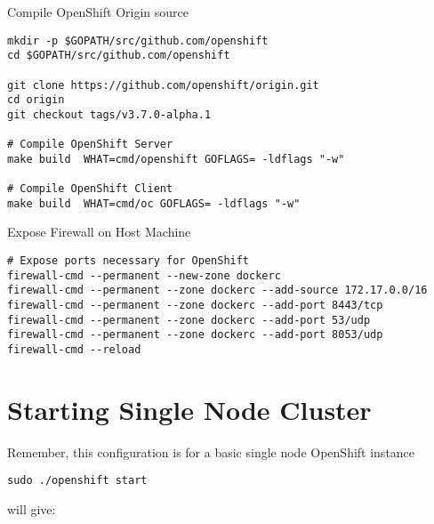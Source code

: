 \documentclass{article}
\begin{document}
Compile OpenShift Origin source
\begin{lstlisting}[style=shell]
mkdir -p $GOPATH/src/github.com/openshift
cd $GOPATH/src/github.com/openshift

git clone https://github.com/openshift/origin.git
cd origin
git checkout tags/v3.7.0-alpha.1

# Compile OpenShift Server
make build  WHAT=cmd/openshift GOFLAGS= -ldflags "-w"

# Compile OpenShift Client
make build  WHAT=cmd/oc GOFLAGS= -ldflags "-w"
\end{lstlisting}

Expose Firewall on Host Machine

\begin{lstlisting}[style=shell]
# Expose ports necessary for OpenShift
firewall-cmd --permanent --new-zone dockerc
firewall-cmd --permanent --zone dockerc --add-source 172.17.0.0/16
firewall-cmd --permanent --zone dockerc --add-port 8443/tcp
firewall-cmd --permanent --zone dockerc --add-port 53/udp
firewall-cmd --permanent --zone dockerc --add-port 8053/udp
firewall-cmd --reload
\end{lstlisting}

\section{Starting Single Node Cluster}
Remember, this configuration is for a basic single node OpenShift instance 

\begin{lstlisting}[style=shell]
sudo ./openshift start
\end{lstlisting}

will give:
\end{document}
